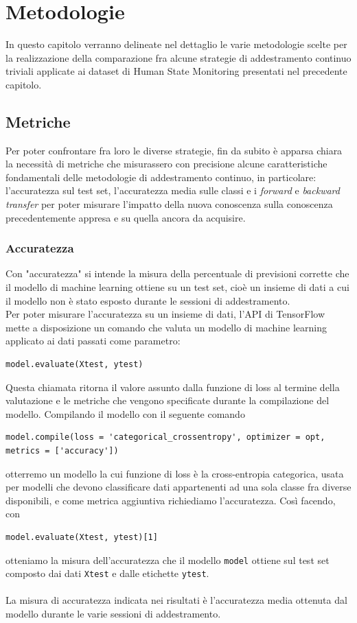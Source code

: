 \chapter{Metodologie}
In questo capitolo verranno delineate nel dettaglio le varie metodologie scelte per la realizzazione della comparazione fra alcune strategie di addestramento continuo triviali applicate ai dataset di Human State Monitoring presentati nel precedente capitolo.

\section{Metriche}
Per poter confrontare fra loro le diverse strategie, fin da subito è apparsa chiara la necessità di metriche che misurassero con precisione alcune caratteristiche fondamentali delle metodologie di addestramento continuo, in particolare: l'accuratezza sul test set, l'accuratezza media sulle classi e i \textit{forward} e \textit{backward transfer} per poter misurare l'impatto della nuova conoscenza sulla conoscenza precedentemente appresa e su quella ancora da acquisire.
\subsection{Accuratezza}
Con "accuratezza" si intende la misura della percentuale di previsioni corrette che il modello di machine learning ottiene su un test set, cioè un insieme di dati a cui il modello non è stato esposto durante le sessioni di addestramento.\\
Per poter misurare l'accuratezza su un insieme di dati, l'API di TensorFlow mette a disposizione un comando che valuta un modello di machine learning applicato ai dati passati come parametro:
\begin{lstlisting}[style = myPython]
model.evaluate(Xtest, ytest)
\end{lstlisting}
Questa chiamata ritorna il valore assunto dalla funzione di loss al termine della valutazione e le metriche che vengono specificate durante la compilazione del modello. Compilando il modello con il seguente comando
\begin{lstlisting}[style = myPython]
model.compile(loss = 'categorical_crossentropy', optimizer = opt, metrics = ['accuracy'])
\end{lstlisting}
otterremo un modello la cui funzione di loss è la cross-entropia categorica, usata per modelli che devono classificare dati appartenenti ad una sola classe fra diverse disponibili, e come metrica aggiuntiva richiediamo l'accuratezza. Così facendo, con
\begin{lstlisting}[style = myPython]
model.evaluate(Xtest, ytest)[1]
\end{lstlisting}
otteniamo la misura dell'accuratezza che il modello \texttt{model} ottiene sul test set composto dai dati \texttt{Xtest} e dalle etichette \texttt{ytest}.\\\\
La misura di accuratezza indicata nei risultati è l'accuratezza media ottenuta dal modello durante le varie sessioni di addestramento.
